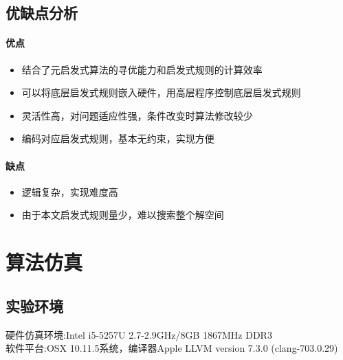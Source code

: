 \documentclass[UTF8]{ctexart}
\begin{document}
\begin{multicols}{2}
\subsection{优缺点分析}
\paragraph{优点}
\begin{itemize}
	\item 结合了元启发式算法的寻优能力和启发式规则的计算效率
	\item 可以将底层启发式规则嵌入硬件，用高层程序控制底层启发式规则
	\item 灵活性高，对问题适应性强，条件改变时算法修改较少
	\item 编码对应启发式规则，基本无约束，实现方便
\end{itemize}
\paragraph{缺点}
\begin{itemize}
	\item 逻辑复杂，实现难度高
	\item 由于本文启发式规则量少，难以搜索整个解空间
\end{itemize}

\section{算法仿真}
\subsection{实验环境}
硬件仿真环境:Intel i5-5257U 2.7-2.9GHz/8GB 1867MHz DDR3 \\
\indent 软件平台:OSX 10.11.5系统，编译器Apple LLVM version 7.3.0 (clang-703.0.29)

\end{multicols}
\end{document}
